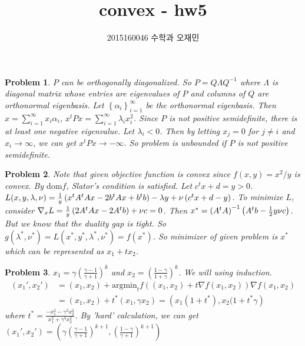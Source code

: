 \documentclass{oblivoir}
\title{convex - hw5}
\author{2015160046 수학과 오재민}
\newtheorem{problem}{Problem}
\begin{document}
\maketitle

\begin{problem}
	$P$ can be orthogonally diagonalized. So $P = Q \Lambda Q^{-1}$ where $\Lambda$ is diagonal matrix whose entries are eigenvalues of $P$ and columns of $Q$ are orthonormal eigenbasis.
	Let $\left\{ \alpha_i \right\}_{i=1}^{\infty}$ be the orthonormal eigenbasis.
	Then $x = \sum_{i=1}^{\infty}x_i \alpha_i$, $x^t P x = \sum_{i=1}^{\infty}\lambda_i x_i^2$. 
	Since $P$ is not positive semidefinite, there is at least one negative eigenvalue. Let $\lambda_i < 0$. Then by letting $x_j = 0$ for $j\ne i$ and $x_i \rightarrow \infty$, we can get $x^t P x\rightarrow -\infty$. So problem is unbounded if $P$ is not positive semidefinite.
\end{problem}

\begin{problem}
	Note that given objective function is convex since $f(x, y) = x^2 / y$ is convex. 
	By $\text{dom}f$, Slator's condition is satisfied.
	Let $c^t x + d = y > 0$.
	$L(x, y, \lambda, \nu) = {1\over y}\left( x^t A^t A x - 2 b^t A x + b^t b \right) -\lambda y + \nu\left( c^t x + d - y \right)$.
	To minimize $L$, consider $\nabla_x L = {1\over y}\left( 2A^t A x - 2A^t b \right) + \nu c = 0$.
	Then $x^* = \left( A^t A \right)^{-1}\left( A^t b - {1\over 2 }y\nu c \right)$. 
	But we know that the duality gap is tight. So $g(\lambda^*, \nu^*) = L(x^*, y^*, \lambda^*, \nu^*) = f(x^*)$.
	So minimizer of given problem is $x^*$ which can be represented as $x_1 + tx_2$.
\end{problem}

\begin{problem}
	$x_1 = \gamma\left( \frac{\gamma -1}{\gamma + 1} \right)^k$ and $x_2 = \left( \frac{1-\gamma}{1+\gamma} \right)^k$.
	We will using induction.
	\begin{equation}
		\begin{split}
		(x_1', x_2') & = (x_1, x_2) + \text{argmin}_t f\left( (x_1, x_2) + t \nabla f (x_1, x_2) \right)\nabla f(x_1, x_2) \\
		& = (x_1, x_2) + t^*(x_1, \gamma x_2) = \left( x_1(1+t^*), x_2(1+t^* \gamma \right)
		\end{split}
	\end{equation}
	where $t^* = \frac{-x_1^2 - \gamma^2 x_2^2}{x_1 ^2 + \gamma^3 x_2^2}$.
	By 'hard' calculation, we can get $\left( x_1', x_2' \right) = \left( \gamma\left( \frac{\gamma -1}{\gamma + 1} \right)^{k+1}, \left( \frac{1-\gamma}{\gamma +1} \right)^{k+1} \right)$
\end{problem}
\end{document}
